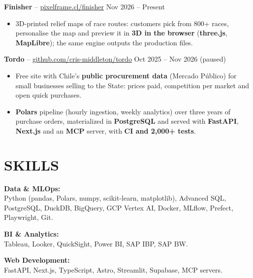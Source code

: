 \documentclass[a4paper,10.5pt]{extarticle}
\begin{document}
\vspace{4pt}

\textbf{Finisher} -- \href{https://pixelframe.cl/finisher/}{pixelframe.cl/finisher} \hfill Nov 2026 -- Present
\begin{itemize}
    \item 3D-printed relief maps of race routes: customers pick from 800+ races, personalise the map and preview it in \textbf{3D in the browser} (\textbf{three.js}, \textbf{MapLibre}); the same engine outputs the production files.
\end{itemize}

\vspace{4pt}

\textbf{Tordo} -- \href{https://github.com/cris-middleton/tordo}{github.com/cris-middleton/tordo} \hfill Oct 2025 -- Nov 2026 (paused)
\begin{itemize}
    \item Free site with Chile's \textbf{public procurement data} (Mercado Público) for small businesses selling to the State: prices paid, competition per market and open quick purchases.
    \item \textbf{Polars} pipeline (hourly ingestion, weekly analytics) over three years of purchase orders, materialized in \textbf{PostgreSQL} and served with \textbf{FastAPI}, \textbf{Next.js} and an \textbf{MCP} server, with \textbf{CI and 2,000+ tests}.
\end{itemize}

\section*{SKILLS}

\textbf{Data \& MLOps:}\\
Python (pandas, Polars, numpy, scikit-learn, matplotlib), Advanced SQL, PostgreSQL, DuckDB, BigQuery, GCP Vertex AI, Docker, MLflow, Prefect, Playwright, Git.

\vspace{4pt}

\textbf{BI \& Analytics:}\\
Tableau, Looker, QuickSight, Power BI, SAP IBP, SAP BW.

\vspace{4pt}

\textbf{Web Development:}\\
FastAPI, Next.js, TypeScript, Astro, Streamlit, Supabase, MCP servers.
\end{document}
